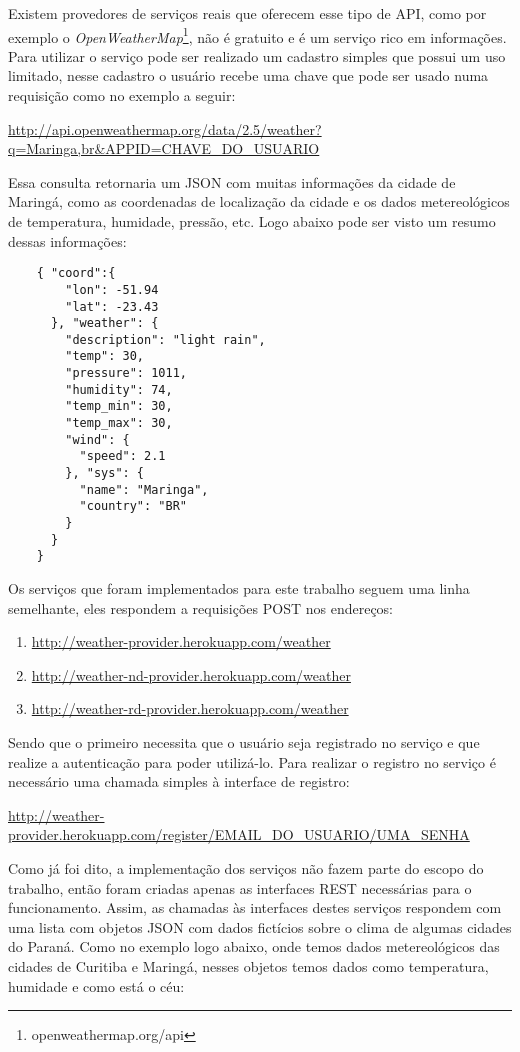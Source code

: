 Existem provedores de serviços reais que oferecem esse tipo de API, como por exemplo o \textit{OpenWeatherMap}\footnote{openweathermap.org/api}, não é gratuito e é um serviço rico em informações. Para utilizar o serviço pode ser realizado um cadastro simples que possui um uso limitado, nesse cadastro o usuário recebe uma chave que pode ser usado numa requisição como no exemplo a seguir:

\url{http://api.openweathermap.org/data/2.5/weather?q=Maringa,br&APPID=CHAVE_DO_USUARIO}

Essa consulta retornaria um JSON com muitas informações da cidade de Maringá, como as coordenadas de localização da cidade e os dados metereológicos de temperatura, humidade, pressão, etc. Logo abaixo pode ser visto um resumo dessas informações:

\begin{verbatim}
    { "coord":{
        "lon": -51.94
        "lat": -23.43
      }, "weather": {
        "description": "light rain",
        "temp": 30,
        "pressure": 1011,
        "humidity": 74,
        "temp_min": 30,
        "temp_max": 30,
        "wind": {
          "speed": 2.1
        }, "sys": {
          "name": "Maringa",
          "country": "BR"
        }
      }
    }
\end{verbatim}

Os serviços que foram implementados para este trabalho seguem uma linha semelhante, eles respondem a requisições POST nos endereços:
\begin{enumerate}
  \item \url{http://weather-provider.herokuapp.com/weather}
  \item \url{http://weather-nd-provider.herokuapp.com/weather}
  \item \url{http://weather-rd-provider.herokuapp.com/weather}
\end{enumerate}

Sendo que o primeiro necessita que o usuário seja registrado no serviço e que realize a autenticação para poder utilizá-lo. Para realizar o registro no serviço é necessário uma chamada simples à interface de registro:

\url{http://weather-provider.herokuapp.com/register/EMAIL_DO_USUARIO/UMA_SENHA}

Como já foi dito, a implementação dos serviços não fazem parte do escopo do trabalho, então foram criadas apenas as interfaces REST necessárias para o funcionamento. Assim, as chamadas às interfaces destes serviços respondem com uma lista com objetos JSON com dados fictícios sobre o clima de algumas cidades do Paraná. Como no exemplo logo abaixo, onde temos dados metereológicos das cidades de Curitiba e Maringá, nesses objetos temos dados como temperatura, humidade e como está o céu:


